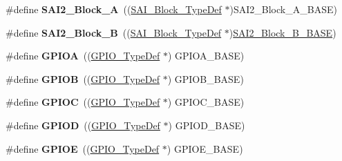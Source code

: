 \begin{DoxyCompactItemize}
\item 
\#define {\bfseries S\+A\+I2\+\_\+\+Block\+\_\+A}~((\hyperlink{struct_s_a_i___block___type_def}{S\+A\+I\+\_\+\+Block\+\_\+\+Type\+Def} $\ast$)S\+A\+I2\+\_\+\+Block\+\_\+\+A\+\_\+\+B\+A\+SE)\hypertarget{group___peripheral__declaration_gadeb449169ceaa1c73656a73be1798193}{}\label{group___peripheral__declaration_gadeb449169ceaa1c73656a73be1798193}

\item 
\#define {\bfseries S\+A\+I2\+\_\+\+Block\+\_\+B}~((\hyperlink{struct_s_a_i___block___type_def}{S\+A\+I\+\_\+\+Block\+\_\+\+Type\+Def} $\ast$)\hyperlink{group___peripheral__memory__map_ga034a6ac8f61e4d15cd9f2f7eca140569}{S\+A\+I2\+\_\+\+Block\+\_\+\+B\+\_\+\+B\+A\+SE})\hypertarget{group___peripheral__declaration_ga95b7e0dbc95a105899223988e999c799}{}\label{group___peripheral__declaration_ga95b7e0dbc95a105899223988e999c799}

\item 
\#define {\bfseries G\+P\+I\+OA}~((\hyperlink{struct_g_p_i_o___type_def}{G\+P\+I\+O\+\_\+\+Type\+Def} $\ast$) G\+P\+I\+O\+A\+\_\+\+B\+A\+SE)\hypertarget{group___peripheral__declaration_gac485358099728ddae050db37924dd6b7}{}\label{group___peripheral__declaration_gac485358099728ddae050db37924dd6b7}

\item 
\#define {\bfseries G\+P\+I\+OB}~((\hyperlink{struct_g_p_i_o___type_def}{G\+P\+I\+O\+\_\+\+Type\+Def} $\ast$) G\+P\+I\+O\+B\+\_\+\+B\+A\+SE)\hypertarget{group___peripheral__declaration_ga68b66ac73be4c836db878a42e1fea3cd}{}\label{group___peripheral__declaration_ga68b66ac73be4c836db878a42e1fea3cd}

\item 
\#define {\bfseries G\+P\+I\+OC}~((\hyperlink{struct_g_p_i_o___type_def}{G\+P\+I\+O\+\_\+\+Type\+Def} $\ast$) G\+P\+I\+O\+C\+\_\+\+B\+A\+SE)\hypertarget{group___peripheral__declaration_ga2dca03332d620196ba943bc2346eaa08}{}\label{group___peripheral__declaration_ga2dca03332d620196ba943bc2346eaa08}

\item 
\#define {\bfseries G\+P\+I\+OD}~((\hyperlink{struct_g_p_i_o___type_def}{G\+P\+I\+O\+\_\+\+Type\+Def} $\ast$) G\+P\+I\+O\+D\+\_\+\+B\+A\+SE)\hypertarget{group___peripheral__declaration_ga7580b1a929ea9df59725ba9c18eba6ac}{}\label{group___peripheral__declaration_ga7580b1a929ea9df59725ba9c18eba6ac}

\item 
\#define {\bfseries G\+P\+I\+OE}~((\hyperlink{struct_g_p_i_o___type_def}{G\+P\+I\+O\+\_\+\+Type\+Def} $\ast$) G\+P\+I\+O\+E\+\_\+\+B\+A\+SE)\hypertarget{group___peripheral__declaration_gae04bdb5e8acc47cab1d0532e6b0d0763}{}\label{group___peripheral__declaration_gae04bdb5e8acc47cab1d0532e6b0d0763}


\end{DoxyCompactItemize}

